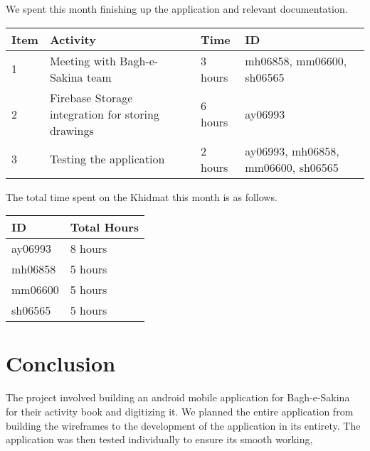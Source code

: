 \documentclass{article}
\begin{document}
We spent this month finishing up the application and relevant documentation.
\vspace{1em}

\noindent \begin{tabular}{|l|l|l|l|}
  \hline
  Item & Activity & Time & ID \\ \hline
  1 & Meeting with Bagh-e-Sakina team & 3 hours & mh06858, mm06600, sh06565 \\ \hline
  2 & Firebase Storage integration for storing drawings & 6 hours & ay06993 \\ \hline
  3 & Testing the application & 2 hours & ay06993, mh06858, mm06600, sh06565 \\ \hline

\end{tabular}

\vspace{1em}

\noindent The total time spent on the Khidmat this month is as follows.

\vspace{1em}

\noindent \begin{tabular}{|l|l|}
  \hline
  ID & Total Hours \\\hline
  ay06993 & 8 hours \\ \hline
  mh06858 & 5 hours  \\ \hline
  mm06600 & 5 hours \\ \hline
  sh06565 & 5 hours \\ \hline
\end{tabular}

\newpage

\section*{Conclusion}

The project involved building an android mobile application for Bagh-e-Sakina for their activity book and digitizing it. We planned the entire application from building the wireframes to the development of the application in its entirety. The application was then tested individually to ensure its smooth working, 

\newpage
\thispagestyle{empty}
\end{document}
